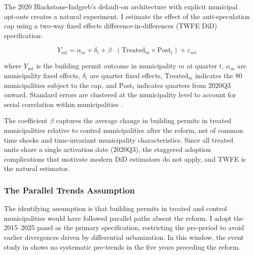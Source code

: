 \documentclass[12pt]{article}
\begin{document}
The 2020 Blackstone-Indgreb's default-on architecture with explicit municipal opt-outs creates a natural experiment. I estimate the effect of the anti-speculation cap using a two-way fixed effects difference-in-differences (TWFE DiD) specification:

\begin{equation}
Y_{mt} = \alpha_m + \delta_t + \beta \cdot (\text{Treated}_m \times \text{Post}_t) + \varepsilon_{mt}
\label{eq:did}
\end{equation}

\noindent where $Y_{mt}$ is the building permit outcome in municipality $m$ at quarter $t$, $\alpha_m$ are municipality fixed effects, $\delta_t$ are quarter fixed effects, $\text{Treated}_m$ indicates the 80 municipalities subject to the cap, and $\text{Post}_t$ indicates quarters from 2020Q3 onward. Standard errors are clustered at the municipality level to account for serial correlation within municipalities \citep{bertrand2004}.

The coefficient $\beta$ captures the average change in building permits in treated municipalities relative to control municipalities after the reform, net of common time shocks and time-invariant municipality characteristics. Since all treated units share a single activation date (2020Q3), the staggered adoption complications that motivate modern DiD estimators \citep{callaway2021,sunAbraham2021} do not apply, and TWFE is the natural estimator.

\subsubsection*{The Parallel Trends Assumption} The identifying assumption is that building permits in treated and control municipalities would have followed parallel paths absent the reform. I adopt the 2015--2025 panel as the primary specification, restricting the pre-period to avoid earlier divergences driven by differential urbanization. In this window, the event study in  shows no systematic pre-trends in the five years preceding the reform.
\end{document}
